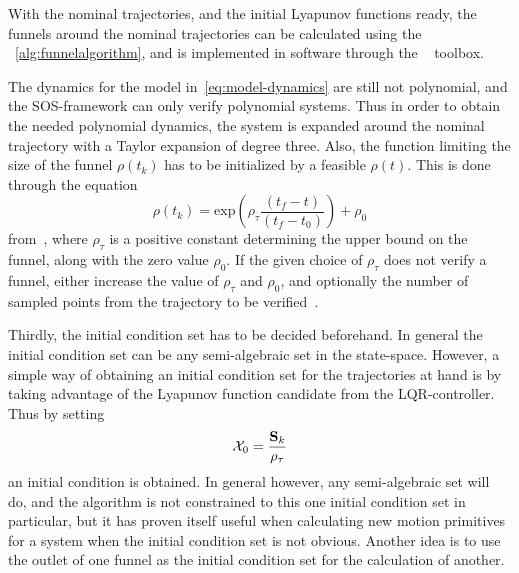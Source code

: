 With the nominal trajectories, and the initial Lyapunov functions ready, the
funnels around the nominal trajectories can be calculated using the
~\cref{alg:funnelalgorithm}, and is implemented in software through the
~\cite[sostools]{sostools} toolbox.

The dynamics for the model in~\cref{eq:model-dynamics} are still not polynomial,
and the \ac{SOS}-framework can only verify polynomial systems. Thus in order to
obtain the needed polynomial dynamics, the system is expanded around the nominal
trajectory with a Taylor expansion of degree three. Also, the function limiting
the size of the funnel \(\rho(t_{k})\) has to be initialized by a feasible
\(\rho(t)\). This is done through the equation
\begin{equation}
  \rho(t_{k}) = \mathrm{exp}\left( \rho_{\tau}\frac{\left( t_{f} - t \right)}{\left( t_{f} - t_{0}  \right)}\right) + \rho_0
\end{equation}
from~\cite[eq.~6.sec~3]{Tobenkin_2011}, where \(\rho_{\tau}\) is a positive
constant determining the upper bound on the funnel, along with the zero value
\(\rho_0\). If the given choice of \(\rho_{\tau}\) does not verify a funnel,
either increase the value of \(\rho_{\tau}\) and \(\rho_0\), and optionally the
number of sampled points from the trajectory to be
verified~\cite{Tobenkin_2011}.

Thirdly, the initial condition set has to be decided beforehand. In general the
initial condition set can be any semi-algebraic set in the state-space. However,
a simple way of obtaining an initial condition set for the trajectories at hand
is by taking advantage of the Lyapunov function candidate from the
\ac{LQR}-controller. Thus by setting
\begin{equation}
  \mathcal{X}_{0} = \frac{ \mathbf{S}_{k}}{\rho_{\tau}}
\end{equation}
an initial condition is obtained. In general however, any semi-algebraic set
will do, and the algorithm is not constrained to this one initial condition set
in particular, but it has proven itself useful when calculating new motion
primitives for a system when the initial condition set is not obvious. Another
idea is to use the outlet of one funnel as the initial condition set for the
calculation of another.

